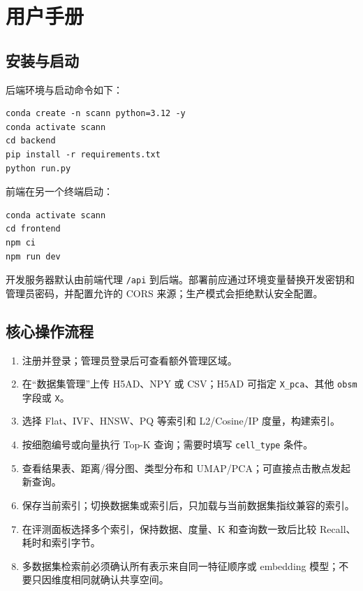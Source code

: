\documentclass[11pt,a4paper]{article}
\newcommand{\code}[1]{\texttt{#1}}
\begin{document}
\section{用户手册}

\subsection{安装与启动}

后端环境与启动命令如下：

\begin{lstlisting}
conda create -n scann python=3.12 -y
conda activate scann
cd backend
pip install -r requirements.txt
python run.py
\end{lstlisting}

前端在另一个终端启动：

\begin{lstlisting}
conda activate scann
cd frontend
npm ci
npm run dev
\end{lstlisting}

开发服务器默认由前端代理 \code{/api} 到后端。部署前应通过环境变量替换开发密钥和管理员密码，并配置允许的 CORS 来源；生产模式会拒绝默认安全配置。

\subsection{核心操作流程}

\begin{enumerate}
  \item 注册并登录；管理员登录后可查看额外管理区域。
  \item 在“数据集管理”上传 H5AD、NPY 或 CSV；H5AD 可指定 \code{X\_pca}、其他 \code{obsm} 字段或 \code{X}。
  \item 选择 Flat、IVF、HNSW、PQ 等索引和 L2/Cosine/IP 度量，构建索引。
  \item 按细胞编号或向量执行 Top-K 查询；需要时填写 \code{cell\_type} 条件。
  \item 查看结果表、距离/得分图、类型分布和 UMAP/PCA；可直接点击散点发起新查询。
  \item 保存当前索引；切换数据集或索引后，只加载与当前数据集指纹兼容的索引。
  \item 在评测面板选择多个索引，保持数据、度量、K 和查询数一致后比较 Recall、耗时和索引字节。
  \item 多数据集检索前必须确认所有表示来自同一特征顺序或 embedding 模型；不要只因维度相同就确认共享空间。
\end{enumerate}
\end{document}
